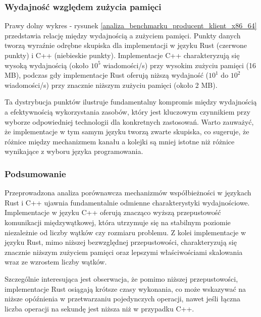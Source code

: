 \subsubsection{Wydajność względem zużycia pamięci}
Prawy dolny wykres - rysunek \ref{analiza_benchmarku_producent_klient_x86_64} przedstawia relację między wydajnością a zużyciem pamięci. Punkty danych tworzą wyraźnie odrębne skupiska dla implementacji w języku Rust (czerwone punkty) i C++ (niebieskie punkty). Implementacje C++ charakteryzują się wysoką wydajnością (około $10^5$ wiadomości/s) przy wysokim zużyciu pamięci (16 MB), podczas gdy implementacje Rust oferują niższą wydajność ($10^1$ do $10^2$ wiadomości/s) przy znacznie niższym zużyciu pamięci (około 2 MB).

Ta dystrybucja punktów ilustruje fundamentalny kompromis między wydajnością a efektywnością wykorzystania zasobów, który jest kluczowym czynnikiem przy wyborze odpowiedniej technologii dla konkretnych zastosowań. Warto zauważyć, że implementacje w tym samym języku tworzą zwarte skupiska, co sugeruje, że różnice między mechanizmem kanału a kolejki są mniej istotne niż różnice wynikające z wyboru języka programowania.

\subsubsection{Podsumowanie}
Przeprowadzona analiza porównawcza mechanizmów współbieżności w językach Rust i C++ ujawnia fundamentalnie odmienne charakterystyki wydajnościowe. Implementacje w języku C++ oferują znacząco wyższą przepustowość komunikacji międzywątkowej, która utrzymuje się na stabilnym poziomie niezależnie od liczby wątków czy rozmiaru problemu. Z kolei implementacje w języku Rust, mimo niższej bezwzględnej przepustowości, charakteryzują się znacznie niższym zużyciem pamięci oraz lepszymi właściwościami skalowania wraz ze wzrostem liczby wątków.

Szczególnie interesująca jest obserwacja, że pomimo niższej przepustowości, implementacje Rust osiągają krótsze czasy wykonania, co może wskazywać na niższe opóźnienia w przetwarzaniu pojedynczych operacji, nawet jeśli łączna liczba operacji na sekundę jest niższa niż w przypadku C++.

